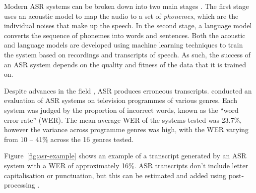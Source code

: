 Modern ASR systems can be broken down into two main stages \citep{Junqua1995}. The first stage uses an acoustic model
to map the audio to a set of \textit{phonemes}, which are the individual noises that make up the speech. In the second
stage, a language model converts the sequence of phonemes into words and sentences. Both the acoustic and language
models are developed using machine learning techniques to train the system based on recordings and transcripts of
speech.  As such, the success of an ASR system depends on the quality and fitness of the data that it is trained on.

Despite advances in the field \citep{Lee1999a}, ASR produces erroneous transcripts.  \citet{Bell2015} conducted an
evaluation of ASR systems on television programmes of various genres. Each system was judged by the proportion of
incorrect words, known as the ``word error rate'' (WER).  The mean average WER of the systems tested was 23.7\%,
however the variance across programme genres was high, with the WER varying from 10 -- 41\% across the 16 genres tested.

Figure~\ref{fig:asr-example} shows an example of a transcript generated by an ASR system with a WER of approximately
16\%.  ASR transcripts don't include letter capitalisation or punctuation, but this can be estimated and added using
post-processing \citep{Gravano2009}.

